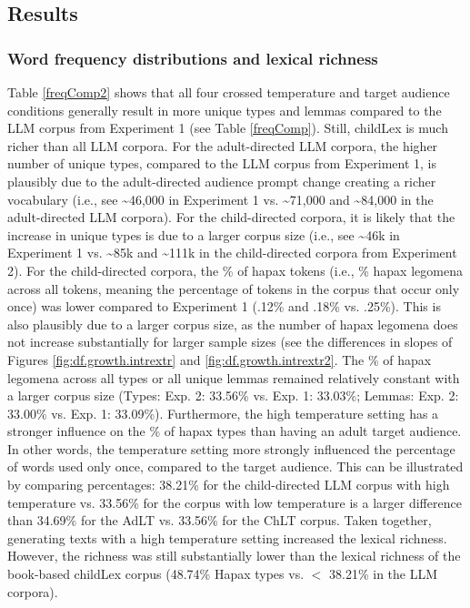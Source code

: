 \documentclass[doc, a4paper]{apa7}
\begin{document}
\subsection{Results}

\subsubsection*{Word frequency distributions and lexical richness}

Table \ref{freqComp2} shows that all four crossed temperature and target audience conditions generally result in more unique types and lemmas compared to the LLM corpus from Experiment 1 (see Table \ref{freqComp}). Still, childLex is much richer than all LLM corpora. For the adult-directed LLM corpora, the higher number of unique types, compared to the LLM corpus from Experiment 1, is plausibly due to the adult-directed audience prompt change creating a richer vocabulary (i.e., see \textasciitilde 46,000 in Experiment 1 vs. \textasciitilde 71,000 and \textasciitilde 84,000 in the adult-directed LLM corpora). For the child-directed corpora, it is likely that the increase in unique types is due to a larger corpus size (i.e., see \textasciitilde 46k in Experiment 1 vs. \textasciitilde 85k and \textasciitilde 111k in the child-directed corpora from Experiment 2). For the child-directed corpora, the \% of hapax tokens (i.e., \% hapax legomena across all tokens, meaning the percentage of tokens in the corpus that occur only once) was lower compared to Experiment 1 (.12\% and .18\% vs. .25\%). This is also plausibly due to a larger corpus size, as the number of hapax legomena does not increase substantially for larger sample sizes (see the differences in slopes of Figures \ref{fig:df.growth.intrextr} and \ref{fig:df.growth.intrextr2}. The \% of hapax legomena across all types or all unique lemmas remained relatively constant with a larger corpus size (Types: Exp. 2: 33.56\% vs. Exp. 1: 33.03\%; Lemmas: Exp. 2: 33.00\% vs. Exp. 1: 33.09\%). Furthermore, the high temperature setting has a stronger influence on the \% of hapax types than having an adult target audience. In other words, the temperature setting more strongly influenced the percentage of words used only once, compared to the target audience. This can be illustrated by comparing percentages: 38.21\% for the child-directed LLM corpus with high temperature vs. 33.56\% for the corpus with low temperature is a larger difference than 34.69\% for the AdLT vs. 33.56\% for the ChLT corpus. Taken together, generating texts with a high temperature setting increased the lexical richness. However, the richness was still substantially lower than the lexical richness of the book-based childLex corpus (48.74\% Hapax types vs. $<$ 38.21\% in the LLM corpora). 
\end{document}
